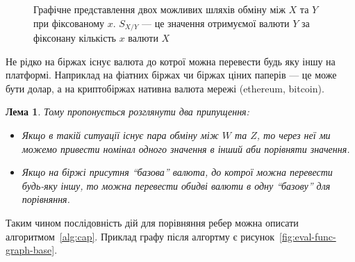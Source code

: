 \documentclass[14pt]{extarticle}
\newtheorem{lemma}{Лема}
\begin{document}
\begin{figure}[h]
	\centering
	\caption{Графічне представлення двох можливих шляхів обміну між $X$ та $Y$
		при фіксованому $x$. $S_{X/Y}$ --- це значення отримуємої валюти $Y$ за
		фіксонану кількість $x$ валюти $X$}\label{fig:eval-func-graph}
\end{figure}

Не рідко на біржах існує валюта до котрої можна перевести будь яку іншу на
платформі. Наприклад на фіатних біржах чи біржах ціних паперів --- це може бути
долар, а на криптобіржах нативна валюта мережі (ethereum, bitcoin).

\begin{lemma}
	Тому пропонується розглянути два припущення:

	\begin{itemize}
		\item Якщо в такій ситуації існує пара обміну між $W$ та $Z$, то через неї
		      ми можемо привести номінал одного значення в інший аби порівняти
		      значення.
		\item Якщо на біржі присутня ``базова'' валюта, до котрої можна перевести
		      будь-яку іншу, то можна перевести обидві валюти в одну ``базову'' для
		      порівняння.
	\end{itemize}
\end{lemma}

Таким чином послідовність дій для порівняння ребер можна описати
алгоритмом~\ref{alg:cap}. Приклад графу після алгортму є
рисунок~\ref{fig:eval-func-graph-base}.
\end{document}
